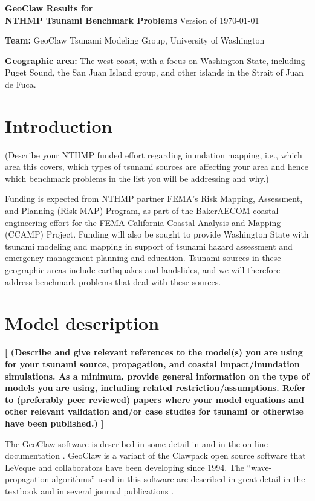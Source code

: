 \documentclass[11pt]{article}
\newcommand{\todo}[1]{{\bf \color{blue} [#1]}}
\begin{document}
\begin{center}
{{\Large\bf
GeoClaw Results for \\
NTHMP Tsunami Benchmark Problems}
\vskip 5pt
Version of \today}
\end{center}


\vskip 15pt
\noindent
{\bf Team:}  GeoClaw Tsunami Modeling Group, University of Washington

\vskip 5pt
\noindent
{\bf Geographic area:}  The west coast, with a focus on Washington State,
including Puget Sound, the San Juan Island group, and other islands in the
Strait of Juan de Fuca.

\vskip 5pt
\section{Introduction}

(Describe your NTHMP funded effort regarding inundation mapping, i.e., which
area this covers, which types of tsunami sources are affecting your area and
hence which benchmark problems in the list you will be addressing and why.)

Funding is expected from NTHMP partner FEMA’s Risk Mapping, Assessment, and
Planning (Risk MAP) Program, as part of the BakerAECOM coastal engineering
effort for the FEMA California Coastal Analysis and Mapping (CCAMP) Project.
Funding will also be sought to provide Washington State with tsunami
modeling and mapping in support of tsunami hazard assessment and emergency
management planning and education.  Tsunami sources in these geographic
areas include earthquakes and landslides, and we will therefore address
benchmark problems that deal with these sources.

\section{Model description}
\todo{
(Describe and give relevant references to the model(s) you are using for
your tsunami source, propagation, and coastal impact/inundation simulations.
As a minimum, provide general information on the type of models you are
using, including related restriction/assumptions. Refer to (preferably peer
reviewed) papers where your model equations and other relevant validation
and/or case studies for tsunami or otherwise have been published.)
}

The GeoClaw software is described in some detail in
\cite{BergerGeorgeLeVequeMandli:awr10,LeVequeGeorgeBerger:an11} and in the
on-line documentation \cite{geoclaw-doc}.  GeoClaw is a variant of the
Clawpack open source
software \cite{claw.org-doc} that LeVeque and collaborators have
been developing since 1994.  The ``wave-propagation algorithms'' used in
this software are described in great detail in the textbook
\cite{rjl:fvmhp} and in several journal publications
\cite{rjl:advect,rjl:waveprop,jol-rjl:3d}.
\end{document}
